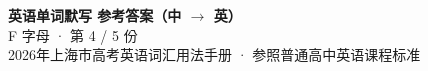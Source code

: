 \documentclass[10pt,a4paper]{article}
\begin{document}
\pagestyle{plain}

\begin{center}
{\LARGE\bfseries 英语单词默写 \quad 参考答案（中 $\to$ 英）}\\[0.22em]
{\large F 字母 · 第 4 / 5 份}\\[0.18em]
{\small 2026年上海市高考英语词汇用法手册 · 参照普通高中英语课程标准}
\end{center}

\vspace{0.2em}
\noindent{\color{rulegray}\rule{\textwidth}{0.8pt}}

\vspace{0.35em}

\vspace{0.25em}
\renewcommand{\arraystretch}{1.32}
\end{document}

